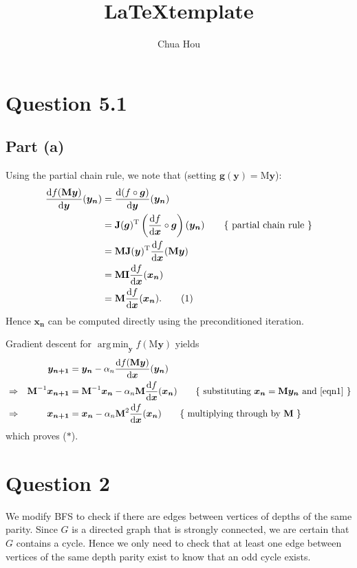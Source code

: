 \documentclass[11pt]{article}
\title{\LaTeX template}
\author{Chua Hou}
\date{}
\newcommand{\br}[1]{\bm{\mathrm{#1}}} %
\newcommand{\numberthis}{\addtocounter{equation}{1}\tag{\theequation}}
\newcommand{\reason}[1]{\tag*{\{ #1 \}}} %
\newcommand{\trans}{^\mathrm{T}} %
\renewcommand{\d}{\mathrm{d}} %
\newcommand{\dydx}[2]{\frac{\d #1}{\d #2}} %
\begin{document}
\maketitle

\section*{Question 5.1}

\subsection*{Part (a)}

Using the partial chain rule, we note that (setting
$\bm{g}(\bm{y}) = \bm{\mathrm{M}y}$):
\begin{align*}
	\dydx{f(\br{M}\bm{y})}{\bm{y}} (\bm{y_n}) &=
	\dydx{(f \circ \bm{g})}{\bm{y}} (\bm{y_n}) \\
	&= \br{J}(\bm{g})\trans
		\left(\dydx{f}{\bm{x}} \circ \bm{g}\right) (\bm{y_n})
		\reason{partial chain rule} \\
	&= \br{MJ}(\bm{y})\trans
		\dydx{f}{\bm{x}}(\bm{\mathrm{M}y}) \\
	&= \br{MI} \dydx{f}{\bm{x}}(\bm{x_n}) \\
	&= \br{M} \dydx{f}{\bm{x}}(\bm{x_n}). \numberthis \label{eqn1}
\end{align*}
Hence $\bm{x_n}$ can be computed directly using the preconditioned iteration.

Gradient descent for $\operatorname{arg\,min}_{\bm{y}} f(\bm{\mathrm{M}y})$
yields
\begin{align*}
	&&\bm{y_{n+1}} &= \bm{y_n} -
		\alpha_n \dydx{f(\br{M}\bm{y})}{\bm{x}} (\bm{y_n}) \\
	&\Rightarrow&\br{M}^{-1} \bm{x_{n+1}} &= \br{M}^{-1} \bm{x_n} -
		\alpha_n \br{M} \dydx{f}{\bm{x}} (\bm{x_n})
		\reason{substituting $\bm{x_n} = \br{M} \bm{y_n}$
			and \eqref{eqn1}} \\
	&\Rightarrow&\bm{x_{n+1}} &= \bm{x_n} -
		\alpha_n \br{M}^2 \dydx{f}{\bm{x}} (\bm{x_n})
		\reason{multiplying through by $\br{M}$}
\end{align*}
which proves ($*$).

\section*{Question 2}

We modify BFS to check if there are edges between vertices of depths of the
same parity. Since $G$ is a directed graph that is strongly connected, we are
certain that $G$ contains a cycle. Hence we only need to check that at least one
edge between vertices of the same depth parity exist to know that an odd cycle
exists.
\end{document}
